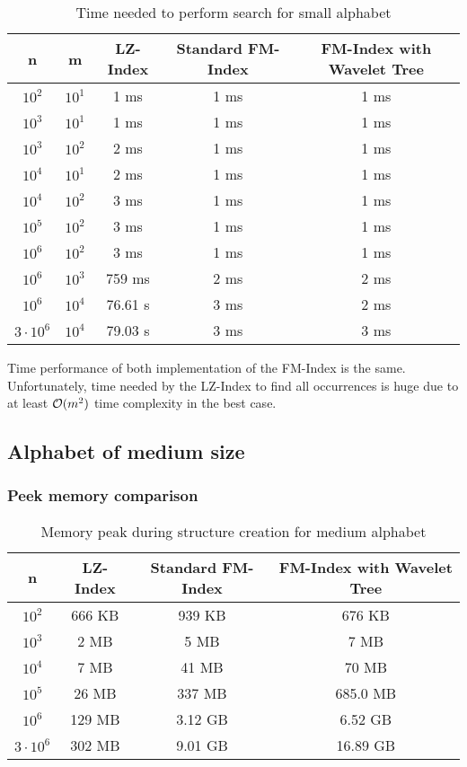 \begin{table}[H]
\begin{center}
\caption{Time needed to perform search for small alphabet}
\begin{tabular}{|c|c|c|c|c|}
\hline
\rowcolor[HTML]{C0C0C0}
n & m & LZ-Index & Standard FM-Index & FM-Index with Wavelet Tree \\ \hline
$10^{2}$ & $10^{1}$ & 1 ms & 1 ms & 1 ms \\ \hline
$10^{3}$ & $10^{1}$ & 1 ms & 1 ms & 1 ms \\ \hline
$10^{3}$ & $10^{2}$ & 2 ms & 1 ms & 1 ms \\ \hline
$10^{4}$ & $10^{1}$ & 2 ms & 1 ms & 1 ms \\ \hline
$10^{4}$ & $10^{2}$ & 3 ms & 1 ms & 1 ms \\ \hline
$10^{5}$ & $10^{2}$ & 3 ms & 1 ms & 1 ms \\ \hline
$10^{6}$ & $10^{2}$ & 3 ms & 1 ms & 1 ms \\ \hline
$10^{6}$ & $10^{3}$ & 759 ms & 2 ms & 2 ms \\ \hline
$10^{6}$ & $10^{4}$ & 76.61 s & 3 ms & 2 ms \\ \hline
$3 \cdot 10^{6}$ & $10^{4}$ & 79.03 s & 3 ms & 3 ms \\ \hline
\end{tabular}
\end{center}
\end{table}

Time performance of both implementation of the FM-Index is the same. Unfortunately, time needed by the LZ-Index to find all occurrences is huge due to at least $\mathcal{O}(m^2)$ time complexity in the best case.

\subsection{Alphabet of medium size}

\subsubsection{Peek memory comparison}

\begin{table}[H]
\begin{center}
\caption{Memory peak during structure creation for medium alphabet}
\begin{tabular}{|c|c|c|c|}
\hline
\rowcolor[HTML]{C0C0C0}
n & LZ-Index & Standard FM-Index & FM-Index with Wavelet Tree \\ \hline
$10^{2}$ & 666 KB & 939 KB & 676 KB \\ \hline
$10^{3}$ & 2 MB & 5 MB & 7 MB \\ \hline
$10^{4}$ & 7 MB & 41 MB & 70 MB \\ \hline
$10^{5}$ & 26 MB & 337 MB & 685.0 MB \\ \hline
$10^{6}$ & 129 MB & 3.12 GB & 6.52 GB \\ \hline
$3 \cdot 10^{6}$ & 302 MB & 9.01 GB & 16.89 GB \\ \hline
\end{tabular}
\end{center}
\end{table}

